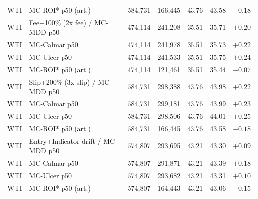 \begin{table}[ht]
\begin{tabular}{llrrrrr}
WTI & \hspace{1em}MC-ROI* p50 (art.) & 584,731 & 166,445 & 43.76 & 43.58 & $-0.18$ \\
WTI & Fee+100\% (2x fee) / MC-MDD p50 & 474,114 & 241,208 & 35.51 & 35.71 & $+0.20$ \\
WTI & \hspace{1em}MC-Calmar p50 & 474,114 & 241,978 & 35.51 & 35.73 & $+0.22$ \\
WTI & \hspace{1em}MC-Ulcer p50 & 474,114 & 241,533 & 35.51 & 35.75 & $+0.24$ \\
WTI & \hspace{1em}MC-ROI* p50 (art.) & 474,114 & 121,461 & 35.51 & 35.44 & $-0.07$ \\
WTI & Slip+200\% (3x slip) / MC-MDD p50 & 584,731 & 298,388 & 43.76 & 43.98 & $+0.22$ \\
WTI & \hspace{1em}MC-Calmar p50 & 584,731 & 299,181 & 43.76 & 43.99 & $+0.23$ \\
WTI & \hspace{1em}MC-Ulcer p50 & 584,731 & 298,506 & 43.76 & 44.01 & $+0.25$ \\
WTI & \hspace{1em}MC-ROI* p50 (art.) & 584,731 & 166,445 & 43.76 & 43.58 & $-0.18$ \\
WTI & Entry+Indicator drift / MC-MDD p50 & 574,807 & 293,695 & 43.21 & 43.30 & $+0.09$ \\
WTI & \hspace{1em}MC-Calmar p50 & 574,807 & 291,871 & 43.21 & 43.39 & $+0.18$ \\
WTI & \hspace{1em}MC-Ulcer p50 & 574,807 & 293,682 & 43.21 & 43.31 & $+0.10$ \\
WTI & \hspace{1em}MC-ROI* p50 (art.) & 574,807 & 164,443 & 43.21 & 43.06 & $-0.15$ \\
\bottomrule
\end{tabular}
\end{table}
